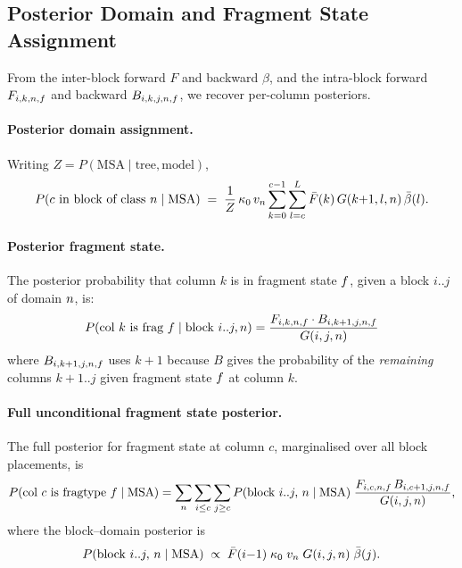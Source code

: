 \subsection{Posterior Domain and Fragment State Assignment}
\label{sec:posterior}

From the inter-block forward $F$ and backward $\beta$, and the
intra-block forward $F_{i,k,n,f}$ and backward
$B_{i,k,j,n,f}$, we recover per-column posteriors.

\paragraph{Posterior domain assignment.}
Writing $Z = P(\text{MSA}\mid\text{tree},\text{model})$,
\begin{equation}
  P(c \text{ in block of class } n \mid \text{MSA}) \;=\;
  \frac{1}{Z}\,\kappa_0\, v_n
  \sum_{k=0}^{c-1} \sum_{l=c}^{L} \bar F(k)\, G(k{+}1, l, n)\, \bar\beta(l).
  \label{eq:post-col}
\end{equation}

\paragraph{Posterior fragment state.}
The posterior probability that column $k$ is in fragment state $f$,
given a block $i..j$ of domain $n$, is:
\begin{equation}
P(\text{col } k \text{ is frag } f \mid \text{block } i..j, n)
= \frac{F_{i,k,n,f} \cdot B_{i,k{+}1,j,n,f}}{G(i, j, n)}
\label{eq:post-frag}
\end{equation}
where $B_{i,k{+}1,j,n,f}$ uses $k{+}1$ because $B$ gives the
probability of the \emph{remaining} columns $k{+}1..j$ given fragment state
$f$ at column $k$.

\paragraph{Full unconditional fragment state posterior.}
The full posterior for fragment state at column $c$, marginalised over
all block placements, is
\begin{equation}
  P(\text{col } c \text{ is fragtype } f \mid \text{MSA})
  = \sum_{n}\sum_{i \leq c}\sum_{j \geq c}
    P(\text{block } i..j,\, n \mid \text{MSA})\;
    \frac{F_{i,c,n,f}\, B_{i,c{+}1,j,n,f}}{G(i,j,n)},
  \label{eq:post-frag-full}
\end{equation}
where the block--domain posterior is
\begin{equation}
  P(\text{block } i..j,\, n \mid \text{MSA})
  \;\propto\; \bar F(i{-}1)\;\kappa_0\;v_n\; G(i,j,n)\;\bar\beta(j).
  \label{eq:post-block}
\end{equation}

